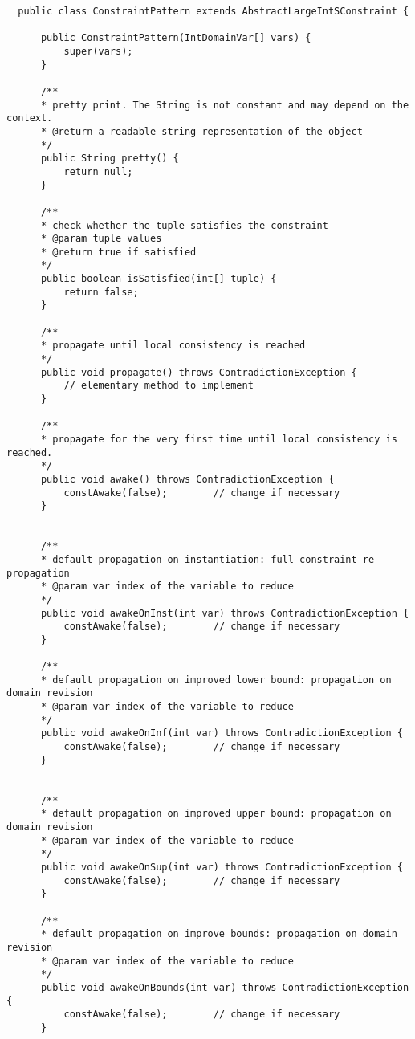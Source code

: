 \begin{lstlisting}
  public class ConstraintPattern extends AbstractLargeIntSConstraint {
      
      public ConstraintPattern(IntDomainVar[] vars) {
          super(vars);
      }
	
      /**
      * pretty print. The String is not constant and may depend on the context.
      * @return a readable string representation of the object
      */
      public String pretty() {
          return null;
      }
	
      /**
      * check whether the tuple satisfies the constraint
      * @param tuple values
      * @return true if satisfied
      */
      public boolean isSatisfied(int[] tuple) {
          return false;
      }

      /**
      * propagate until local consistency is reached
      */
      public void propagate() throws ContradictionException {
          // elementary method to implement
      }
	    
      /**
      * propagate for the very first time until local consistency is reached.
      */
      public void awake() throws ContradictionException {
          constAwake(false);        // change if necessary
      }
	
	
      /**
      * default propagation on instantiation: full constraint re-propagation
      * @param var index of the variable to reduce
      */
      public void awakeOnInst(int var) throws ContradictionException {
          constAwake(false);        // change if necessary
      }
	
      /**
      * default propagation on improved lower bound: propagation on domain revision
      * @param var index of the variable to reduce
      */
      public void awakeOnInf(int var) throws ContradictionException {
          constAwake(false);        // change if necessary
      }
	
	
      /**
      * default propagation on improved upper bound: propagation on domain revision
      * @param var index of the variable to reduce
      */
      public void awakeOnSup(int var) throws ContradictionException {
          constAwake(false);        // change if necessary
      }
	
      /**
      * default propagation on improve bounds: propagation on domain revision
      * @param var index of the variable to reduce
      */
      public void awakeOnBounds(int var) throws ContradictionException {
          constAwake(false);        // change if necessary
      }
	

\end{lstlisting}
